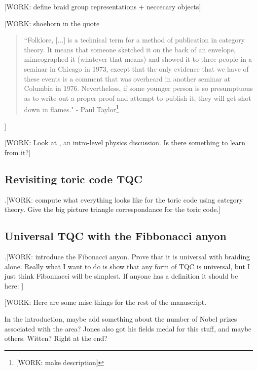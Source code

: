\documentclass{article}
\theoremstyle{definition}
\numberwithin{figure}{section}
\begin{document}
[WORK: define braid group representations + neccecary objects]

[WORK: shoehorn in the quote

\begin{quote}
``Folklore, [...] is a technical term for a method of publication in category theory. It means that someone sketched it on the back of an envelope, mimeographed it (whatever that means) and showed it to three people in a seminar in Chicago in 1973, except that the only evidence that we have of these events is a comment that was overheard in another seminar at Columbia in 1976. Nevertheless, if some younger person is so presumptuous as to write out a proper proof and attempt to publish it, they will get shot down in flames." - Paul Taylor\footnote{[WORK: make description]\cite{aubert2019categories}}
\end{quote}

]

[WORK: Look at \cite{lahtinen2017short}, an intro-level physics discussion. Is there something to learn from it?]



\subsection{Revisiting toric code TQC}
\label{Revisiting toric code TQC}

.[WORK: compute what everything looks like for the toric code using category theory. Give the big picture triangle correspondance for the toric code.]


\subsection{Universal TQC with the Fibbonacci anyon}
\label{Universal TQC with the Fibbonacci anyon}

.[WORK: introduce the Fibonacci anyon. Prove that it is universal with braiding alone. Really what I want to do is show that any form of TQC is universal, but I just think Fibonnacci will be simplest. If anyone has a definition it should be here: \cite{trebst2008short}]




[WORK: Here are some misc things for the rest of the manuscript.

In the introduction, maybe add something about the number of Nobel prizes associated with the area? Jones also got his fields medal for this stuff, and maybe others. Witten? Right at the end?
\end{document}
